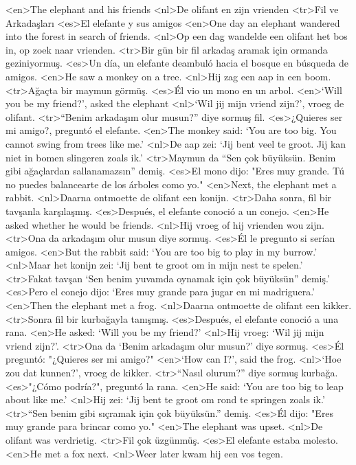 <en>The elephant and his friends  
<nl>De olifant en zijn vrienden 
<tr>Fil ve Arkadaşları 
<es>El elefante y sus amigos
<en>One day an elephant wandered into the forest in search of friends. 
<nl>Op een dag wandelde  een  olifant het bos in, op zoek naar vrienden. 
<tr>Bir gün bir fil arkadaş aramak için ormanda geziniyormuş. 
<es>Un día, un elefante deambuló hacia el bosque en búsqueda de amigos.
<en>He saw a monkey on a tree.  
<nl>Hij zag een aap in een boom.  
<tr>Ağaçta bir maymun görmüş. 
<es>Él vio un mono en un arbol.
<en>`Will you be my friend?', asked the elephant  
<nl>`Wil jij mijn  vriend zijn?', vroeg de olifant.  
<tr>“Benim arkadaşım olur musun?” diye sormuş fil. 
<es>¿Quieres ser mi amigo?, preguntó el elefante.
<en>The monkey said: `You are too big. You cannot swing from trees like me.'
<nl>De aap zei: `Jij bent veel te groot. Jij kan niet in bomen slingeren zoals ik.'  
<tr>Maymun da “Sen çok büyüksün. Benim gibi ağaçlardan sallanamazsın” demiş. 
<es>El mono dijo: "Eres muy grande. Tú no puedes balancearte de los árboles como yo."
<en>Next, the elephant met a rabbit.  
<nl>Daarna ontmoette de olifant een konijn.  
<tr>Daha sonra, fil bir tavşanla karşılaşmış. 
<es>Después, el elefante conoció a un conejo.
<en>He asked whether he would be friends. 
<nl>Hij vroeg of hij vrienden wou zijn.  
<tr>Ona da arkadaşım olur musun diye sormuş. 
<es>Él le pregunto si serían amigos.
<en>But the rabbit said: `You are too big to play in my burrow.'  
<nl>Maar het konijn zei: `Jij bent te groot om in mijn nest te spelen.'  
<tr>Fakat tavşan `Sen benim  yuvamda oynamak için çok büyüksün” demiş.'
<es>Pero el conejo dijo: `Eres muy grande para jugar en mi madriguera.'
<en>Then the elephant met a frog. 
<nl>Daarna ontmoette de olifant een kikker.  
<tr>Sonra fil bir kurbağayla tanışmış. 
<es>Después, el elefante conoció a una rana.
<en>He asked: `Will you be my friend?' 
<nl>Hij vroeg: `Wil jij mijn vriend zijn?'.  
<tr>Ona da `Benim arkadaşım olur musun?' diye sormuş. 
<es>Él preguntó: "¿Quieres ser mi amigo?"
<en>`How  can I?', said the frog. 
<nl>`Hoe zou dat kunnen?', vroeg de kikker.  
<tr>“Nasıl olurum?” diye sormuş kurbağa.  
<es>"¿Cómo podría?", preguntó la rana.
<en>He said: `You are too big to leap about like me.' 
<nl>Hij zei: `Jij bent te groot om rond te springen zoals ik.'  
<tr>“Sen benim gibi sıçramak için çok büyüksün.” demiş. 
<es>Él dijo: "Eres muy grande para brincar como yo."
<en>The elephant was upset.  
<nl>De olifant was verdrietig.  
<tr>Fil çok üzgünmüş. 
<es>El elefante estaba molesto.
<en>He met a fox next. 
<nl>Weer later kwam hij een vos tegen.  
